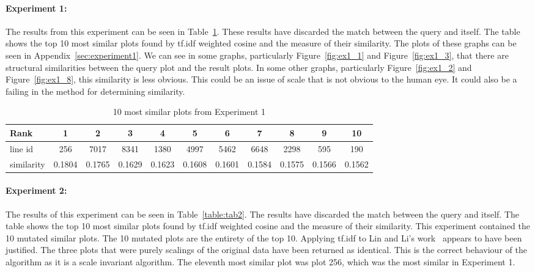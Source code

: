 \paragraph*{Experiment 1:} The results from this experiment can be seen in Table~\ref{table:tab1}.  These results have discarded the match between the query and itself.  The table shows the top 10 most similar plots found by \ac{tf.idf} weighted cosine and the measure of their similarity.  The plots of these graphs can be seen in Appendix~\ref{sec:experiment1}.  We can see in some graphs, particularly Figure~\ref{fig:ex1_1} and Figure~\ref{fig:ex1_3}, that there are structural similarities between the query plot and the result plots.  In some other graphs, particularly Figure~\ref{fig:ex1_2} and Figure~\ref{fig:ex1_8}, this similarity is less obvious.  This could be an issue of scale that is not obvious to the human eye.  It could also be a failing in the method for determining similarity.

\begin{table}[h]
\begin{center}
    \resizebox{0.8\textwidth}{!} {\begin{minipage}{\textwidth}
    \begin{tabular}{ | l | c | c | c | c | c | c | c | c | c | c | }
        \hline
        Rank & 1 & 2 & 3 & 4 & 5 & 6 & 7 & 8 & 9 & 10 \\
        \hline
        line id & 256 & 7017 & 8341 & 1380 & 4997 & 5462 & 6648 & 2298 & 595 & 190 \\
        \hline
        similarity & 0.1804 & 0.1765 & 0.1629 & 0.1623 & 0.1608 & 0.1601 & 0.1584 & 0.1575 & 0.1566 & 0.1562 \\
        \hline
    \end{tabular}
    \caption{10 most similar plots from Experiment 1}
    \label{table:tab1}
    \end{minipage}}
\end{center}
\end{table}

\paragraph*{Experiment 2:} The results of this experiment can be seen in Table~\ref{table:tab2}.  The results have discarded the match between the query and itself.  The table shows the top 10 most similar plots found by \ac{tf.idf} weighted cosine and the measure of their similarity.  This experiment contained the 10 mutated similar plots.  The 10 mutated plots are the entirety of the top 10.  Applying \ac{tf.idf} to Lin and Li's work~\cite{structural_similarity} appears to have been justified.  The three plots that were purely scalings of the original data have been returned as identical.  This is the correct behaviour of the algorithm as it is a scale invariant algorithm.  The eleventh most similar plot was plot 256, which was the most similar in Experiment 1.

